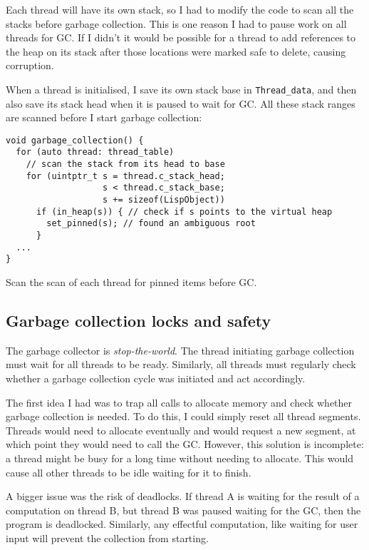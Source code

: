 Each thread will have its own stack, so I had to modify the code to scan all the stacks before garbage
collection. This is one reason I had to pause work on all threads for GC. If I didn't it would be possible
for a thread to add references to the heap on its stack after those locations were marked safe to delete,
causing corruption.

When a thread is initialised, I save its own stack base in \texttt{Thread\_data}, and then also save its stack head
when it is paused to wait for GC. All these stack ranges are scanned before I start garbage collection:

\begin{code}
\begin{verbatim}
void garbage_collection() {
  for (auto thread: thread_table)
    // scan the stack from its head to base
    for (uintptr_t s = thread.c_stack_head;
                   s < thread.c_stack_base;
                   s += sizeof(LispObject))
      if (in_heap(s)) { // check if s points to the virtual heap
        set_pinned(s); // found an ambiguous root
      }
  ...
}
\end{verbatim}
\caption{Scan the scan of each thread for pinned items before GC.}
\label{code:parstackscan}
\end{code}

\subsection{Garbage collection locks and safety}
\label{sec:gclock}
The garbage collector is \emph{stop-the-world}. The thread initiating garbage collection must wait for all
threads to be ready. Similarly, all threads must regularly check whether a garbage collection cycle was
initiated and act accordingly.

The first idea I had was to trap all calls to allocate memory and check whether garbage collection is needed.
To do this, I could simply reset all thread segments. Threads would need to allocate eventually and
would request a new segment, at which point they would need to call the GC. However, this solution is incomplete:
a thread might be busy for a long time without needing to allocate. This would cause all other
threads to be idle waiting for it to finish.

A bigger issue was the risk of deadlocks. If thread A is waiting for the result of a computation on thread B,
but thread B was paused waiting for the GC, then the program is deadlocked. Similarly, any effectful computation,
like waiting for user input will prevent the collection from starting.

